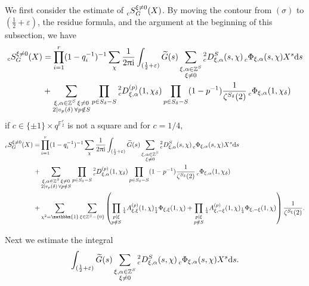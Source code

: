 \documentclass[10pt,oneside,reqno]{amsart}
\makeatletter
\newcommand\rmd{\mathrm{d}}
\newcommand\rmi{\mathrm{i}}
\newcommand\FF{\mathbb{F}}
\newcommand\ZZ{\mathbb{Z}}
\newcommand\triv{\mathbbm{1}}
\newcommand\dpii{2\uppi\rmi}
\theoremstyle{THEOREM}
\theoremstyle{DEFINITION}
\theoremstyle{EXERCISE}
\numberwithin{equation}{section}
\renewenvironment{proof}[1][\proofname]{\par
  \vspace{-6pt}
  \pushQED{\qed}
  \normalfont \topsep6\p@\@plus6\p@\relax
  \trivlist
  \item[\hskip\labelsep\rmfamily\bfseries
    #1\@addpunct{:}]\ignorespaces
}{
  \popQED\endtrivlist\@endpefalse
  \vspace{-6pt}
}
\makeatother
\begin{document}
\begin{proof}
We first consider the estimate of $\prescript{}{c}S_G^{\xi\neq 0}(X)$. 
By moving the contour from $(\sigma)$ to $(\frac12+\varepsilon)$, the residue formula, and the argument at the beginning of this subsection, we have
\begin{align*}
_cS_G^{\xi\neq 0}(X)&=\prod_{i=1}^{r}(1-q_i^{-1})^{-1}\sum_{\chi}\frac{1}{\dpii}\int_{(\frac12+\varepsilon)}\widetilde{G}(s) \sum_{\substack{\xi,\alpha\in \ZZ^S\\ \xi\neq 0}}{}^2_c D_{\xi,\alpha}^S(s,\chi){}\prescript{}{c}\Phi_{\xi,\alpha}(s,\chi)X^s\rmd s\\
&+\sum_{\substack{\xi,\alpha\in \ZZ^S\, \xi\neq 0\\ 2\mid v_p(\delta)\,\forall p\notin S}}\prod_{p\in S_\delta-S}\prescript{2}{c}D_{\xi,\alpha}^{(p)}(1,\chi_\delta) \prod_{p\in S_\delta-S}(1-p^{-1})\frac{1}{\zeta^{S_\delta}(2)}\prescript{}{c}\Phi_{\xi,\alpha} (1,\chi_\delta)
\end{align*}
if $c\in \{\pm 1\}\times q^{\FF_2^r}$ is not a square and for $c=1/4$,
\begin{align*}
_cS_G^{\xi\neq 0}(X)=&\prod_{i=1}^{r}(1-q_i^{-1})^{-1}\sum_{\chi}\frac{1}{\dpii}\int_{(\frac12+\varepsilon)}\widetilde{G}(s) \sum_{\substack{\xi,\alpha\in \ZZ^S\\ \xi\neq 0}}{}^2_c D_{\xi,\alpha}^S(s,\chi){}\prescript{}{c}\Phi_{\xi,\alpha}(s,\chi)X^s\rmd s\\
+&\sum_{\substack{\xi,\alpha\in \ZZ^S\, \xi\neq 0\\ 2\mid v_p(\delta)\,\forall p\notin S}}\prod_{p\in S_\delta-S}\prescript{2}{c}D_{\xi,\alpha}^{(p)}(1,\chi_\delta) \prod_{p\in S_\delta-S}(1-p^{-1})\frac{1}{\zeta^{S_\delta}(2)}\prescript{}{c}\Phi_{\xi,\alpha} (1,\chi_\delta)\\
+&\sum_{\chi^2=\triv}\sum_{\xi\in \ZZ^S-\{0\}}\left(\prod_{\substack{p\mid \xi\\ p\notin S}}{}_{\frac14}A_{\xi,\xi}^{(p)}(1,\chi){}_\frac14 \Phi_{\xi,\xi}(1,\chi)+\prod_{\substack{p\mid \xi\\ p\notin S}}{}_{\frac14}A_{\xi,-\xi}^{(p)}(1,\chi){}_\frac14 \Phi_{\xi,-\xi}(1,\chi)\right) \frac{1}{\zeta^{S_{\xi}}(2)}.
\end{align*}

Next we estimate the integral
\begin{equation}\label{eq:sxialphaestimate}
\int_{(\frac12+\varepsilon)}\widetilde{G}(s) \sum_{\substack{\xi,\alpha\in \ZZ^S\\ \xi\neq 0}}{}^2_c D_{\xi,\alpha}^S(s,\chi){}\prescript{}{c}\Phi_{\xi,\alpha}(s,\chi)X^s\rmd s.
\end{equation}


\end{proof}
\end{document}

